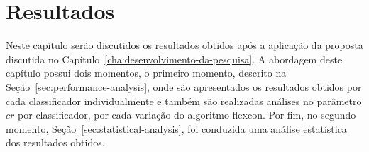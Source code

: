 


\chapter{Resultados}
    \label{cha:resultados}
    Neste capítulo serão discutidos os resultados obtidos após a aplicação da proposta discutida no Capítulo~\ref{cha:desenvolvimento-da-pesquisa}.
    A abordagem deste capítulo possui dois momentos, o primeiro momento, descrito na Seção~\ref{sec:performance-analysis}, onde são apresentados os resultados obtidos por cada classificador individualmente e também são realizadas análises no parâmetro $cr$ por classificador, por cada variação do algoritmo \ac{flexcon}. Por fim, no segundo momento, Seção~\ref{sec:statistical-analysis}, foi conduzida uma análise estatística dos resultados obtidos.
    
    
    
